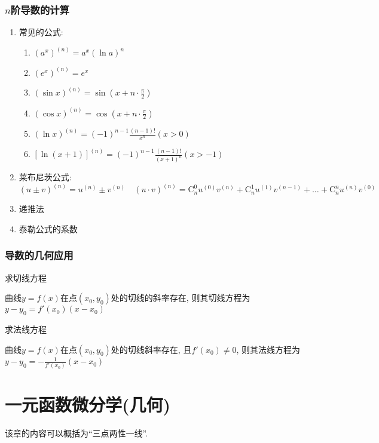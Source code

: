 \subsection{$ n $阶导数的计算}
\begin{enumerate}
    \item 常见的公式:
          \begin{enumerate}
              \item $ (a^{x})^{(n)}=a^{x}(\ln a)^{n} $
              \item $ (e^{x})^{(n)}=e^{x} $
              \item $ (\sin x)^{(n)}=\sin (x+n\cdot \frac{\pi}{2}) $
              \item $ (\cos x)^{(n)}=\cos (x+n\cdot \frac{\pi}{2}) $
              \item $ (\ln x)^{(n)}=(-1)^{n-1}\frac{(n-1)!}{x^{n}}(x>0) $
              \item $ [\ln (x+1)]^{(n)}=(-1)^{n-1}\frac{(n-1)!}{(x+1)^{n}}(x>-1) $
          \end{enumerate}
    \item 莱布尼茨公式:
          \begin{equation*}
              (u\pm v)^{(n)}=u^{(n)}\pm v^{(n)}\quad (u\cdot v)^{(n)}=\mathrm{C}_{n}^{0}u^{(0)}v^{(n)}+\mathrm{C}_{n}^{1}u^{(1)}v^{(n-1)}+\dots+\mathrm{C}_{n}^{n}u^{(n)}v^{(0)}
          \end{equation*}
    \item 递推法
    \item 泰勒公式的系数
\end{enumerate}
\subsection{导数的几何应用}
{\kaishu 求切线方程} \par \vspace{.5em}
曲线$ y=f(x) $在点$ (x_{0}, y_{0}) $处的切线的斜率存在, 则其切线方程为$ y-y_{0}=f'(x_{0})(x-x_{0}) $ \par \vspace{.5em}
{\kaishu 求法线方程} \par \vspace{.5em}
曲线$ y=f(x) $在点$ (x_{0}, y_{0}) $处的切线斜率存在, 且$ f'(x_{0})\neq 0 $, 则其法线方程为$ y-y_{0}=-\frac{1}{f'(x_{0})}(x-x_{0}) $ \par \vspace{.5em}
\chapter{一元函数微分学(几何)}
该章的内容可以概括为``三点两性一线''.
